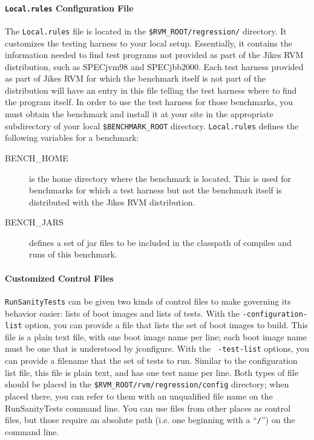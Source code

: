 \paragraph{\texttt{\textbf{Local.rules}} Configuration File}

The {\tt Local.rules} file is located in the 
{\tt \$RVM\_\-ROOT/\-re\-gres\-sion/} directory. 
It customizes the testing harness to your local
setup.  Essentially, it contains the information needed to find test
programs not provided as part of the Jikes RVM distribution, such as
SPECjvm\Rweb{}98 and SPECjbb\Rboth{}2000.  Each test harness
provided as part of Jikes RVM for which the benchmark itself is
not part of the distribution will have an entry in this file telling
the test harness where to find the program itself.  In order to use
the test harness for those benchmarks, you must obtain the benchmark
and install it at your site in the appropriate subdirectory of your
local {\tt \$BENCHMARK\_\-ROOT} directory. {\tt{Local.rules}} defines 
the following variables for a benchmark:
\begin{description}
\item[BENCH\_HOME] is the home directory where the benchmark is
located.  This is used for benchmarks for which a test harness but not
the benchmark itself is distributed with the Jikes RVM distribution. 
\item[BENCH\_JARS] defines a set of jar files to be included in the
classpath of compiles and runs of this benchmark.
\end{description}

\paragraph{Customized Control Files}

 {\tt{RunSanityTests}} can be given two kinds of control files to make
governing its behavior easier: lists of boot images and lists of
tests.  With the {\tt -con\-fi\-gu\-ra\-tion-list} option, you can provide a
file that lists the set of boot images to build.  This file is a plain
text file, with one boot image name per line; each boot image name
must be one that is understood by jconfigure.  With the {\tt
-test-list} options, you can provide a filename that the set of tests
to run.  Similar to the configuration list file, this file is plain
text, and has one test name per line.  Both types of file should be
placed in the {\tt \$RVM\_\-ROOT/rvm/regression/config} directory; when placed
there, you can refer to them with an unqualified file name on the
RunSanityTests command line.  You can use files from other places as
control files, but those require an absolute path (i.e. one beginning
with a ``{\tt /}'') on the command line.


